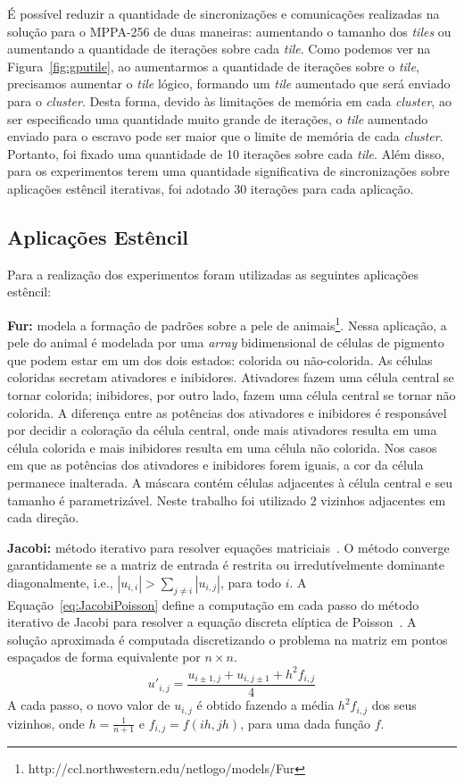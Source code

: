\documentclass[12pt]{article}
\newcommand{\mppa}{MPPA-256\xspace}
\begin{document}
É possível reduzir a quantidade de sincronizações e comunicações realizadas na
solução para o \mppa de duas maneiras: aumentando o tamanho dos \textit{tiles}
ou aumentando a quantidade de iterações sobre cada \textit{tile}. Como podemos
ver na Figura~\ref{fig:gputile}, ao aumentarmos a quantidade de iterações sobre
o \textit{tile}, precisamos aumentar o \textit{tile} lógico, formando um
\textit{tile} aumentado que será enviado para o \textit{cluster}. Desta forma,
devido às limitações de memória em cada \textit{cluster}, ao ser especificado
uma quantidade muito grande de iterações, o \textit{tile} aumentado enviado para
o escravo pode ser maior que o limite de memória de cada \textit{cluster}.
Portanto, foi fixado uma quantidade de 10 iterações sobre cada \textit{tile}.
Além disso, para os experimentos terem uma quantidade significativa de
sincronizações sobre aplicações estêncil iterativas, foi adotado 30 iterações
para cada aplicação.

\subsection{Aplicações Estêncil}

Para a realização dos experimentos foram utilizadas as seguintes aplicações estêncil:

\textbf{Fur:} modela a formação de padrões sobre a pele de
animais\footnote{{http://ccl.northwestern.edu/netlogo/models/Fur}}. Nessa
aplicação, a pele do animal é modelada por uma \textit{array} bidimensional de
células de pigmento que podem estar em um dos dois estados: colorida ou
não-colorida. As células coloridas secretam ativadores e inibidores. Ativadores
fazem uma célula central se tornar colorida; inibidores, por outro lado, fazem
uma célula central se tornar não colorida.
A diferença entre as potências dos ativadores e inibidores é responsável por
decidir a coloração da célula central, onde mais ativadores resulta em uma
célula colorida e mais inibidores resulta em uma célula não colorida. Nos casos
em que as potências dos ativadores e inibidores forem iguais, a cor da célula
permanece inalterada. A máscara contém células adjacentes à célula central e seu
tamanho é parametrizável. Neste trabalho foi utilizado $2$ vizinhos adjacentes
em cada direção.

\textbf{Jacobi:} método iterativo para resolver equações matriciais~\cite{demmel97}.
O método converge garantidamente se a matriz de entrada é restrita ou irredutívelmente dominante diagonalmente, i.e., $|u_{i,i}| > \sum_{j\neq i}{|u_{i,j}|}$, para todo $i$.
A Equação~\ref{eq:JacobiPoisson} define a computação em cada passo do método
iterativo de Jacobi para resolver a equação discreta elíptica de
Poisson~\cite{demmel97}. A solução aproximada é computada discretizando o
problema na matriz em pontos espaçados de forma equivalente por $n\times n$.\\
 \begin{equation}
 u'_{i,j} = \frac{u_{i\pm1,j} + u_{i,j\pm1} + h^2f_{i,j}}{4}
 \label{eq:JacobiPoisson}
 \end{equation}
 A cada passo, o novo valor de $u_{i,j}$ é obtido fazendo a média $h^2f_{i,j}$ dos seus vizinhos, onde $h = \frac{1}{n+1}$ e $f_{i,j} = f(ih,jh)$,
 para uma dada função $f$.
\end{document}
